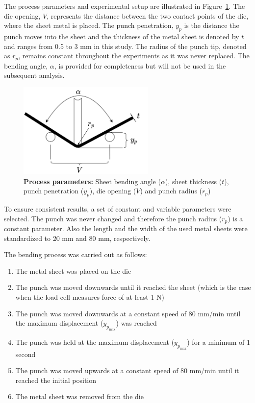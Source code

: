 {The process parameters and experimental setup are illustrated in Figure~\ref{fig:process_parameters}.
The die opening, $V$, represents the distance between the two contact points of the die, where the sheet metal is
placed.
The punch penetration, $y_p$ is the distance the punch moves into the sheet and
the thickness of the metal sheet is denoted by $t$ and ranges from 0.5 to 3 mm in this study.
The radius of the punch tip, denoted as $r_p$, remains constant throughout the experiments as it was never replaced.
The bending angle, $\alpha$, is provided for completeness but will not be used in the subsequent analysis.

\begin{figure}[h]
    \begin{tcolorbox}[arc=0pt,boxrule=0.5pt]
        \centering
        \includegraphics[trim=left botm right top, width=0.6\textwidth,
            clip]{chap4/images/process_parameters}
    \end{tcolorbox}
    \caption{\textbf{Process parameters:} Sheet bending angle ($\alpha$), sheet
    thickness ($t$), punch
    penetration ($y_p$), die opening ($V$) and punch radius ($r_p$)}
    \label{fig:process_parameters}
\end{figure}

To ensure consistent results, a set of constant and variable parameters were selected.
The punch was never changed and therefore the punch radius ($r_p$) is a constant parameter.
Also the length and the width of the used metal sheets were standardized to 20 mm and 80 mm, respectively.

The bending process was carried out as follows:
\begin{enumerate}
    \item The metal sheet was placed on the die
    \item The punch was moved downwards until it reached the sheet (which is the case when the load cell measures
    force of at least 1 N)
    \item The punch was moved downwards at a constant speed of 80 mm/min until the maximum displacement ($y_p_{\max}$)
    was reached
    \item The punch was held at the maximum displacement ($y_p_{\max}$) for a minimum of 1 second
    \item The punch was moved upwards at a constant speed of 80 mm/min until it reached the initial position
    \item The metal sheet was removed from the die
\end{enumerate}

}
